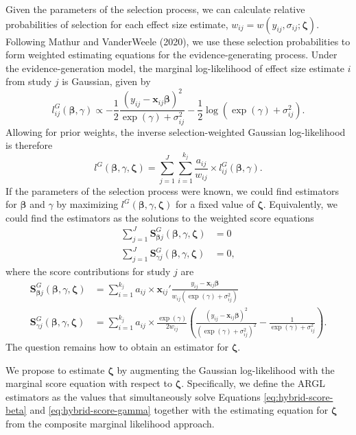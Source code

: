 \documentclass[
  american,
  man, donotrepeattitle,floatsintext]{apa7}
\begin{document}
Given the parameters of the selection process, we can calculate relative probabilities of selection for each effect size estimate, \(w_{ij} = w(y_{ij}, \sigma_{ij}; \boldsymbol\zeta)\). Following Mathur and VanderWeele (2020), we use these selection probabilities to form weighted estimating equations for the evidence-generating process. Under the evidence-generation model, the marginal log-likelihood of effect size estimate \(i\) from study \(j\) is Gaussian, given by
\[
l^G_{ij}(\boldsymbol\beta, \gamma) \propto - \frac{1}{2}\frac{(y_{ij} - \mathbf{x}_{ij} \boldsymbol\beta)^2}{\exp(\gamma) + \sigma_{ij}^2} - \frac{1}{2}\log(\exp(\gamma) + \sigma_{ij}^2).
\]
Allowing for prior weights, the inverse selection-weighted Gaussian log-likelihood is therefore
\[
l^G(\boldsymbol\beta, \gamma, \boldsymbol\zeta) = \sum_{j=1}^J \sum_{i=1}^{k_j} \frac{a_{ij}} {w_{ij}} \times l^G_{ij}(\boldsymbol\beta, \gamma).
\]
If the parameters of the selection process were known, we could find estimators for \(\boldsymbol\beta\) and \(\gamma\) by maximizing \(l^G(\boldsymbol\beta, \gamma, \boldsymbol\zeta)\) for a fixed value of \(\boldsymbol\zeta\).
Equivalently, we could find the estimators as the solutions to the weighted score equations
\begin{align}
\sum_{j=1}^J \mathbf{S}^G_{\boldsymbol\beta j} (\boldsymbol\beta, \gamma, \boldsymbol\zeta) &= 0 \label{eq:hybrid-score-beta} \\
\sum_{j=1}^J \mathbf{S}^G_{\gamma j} (\boldsymbol\beta, \gamma, \boldsymbol\zeta) &= 0, \label{eq:hybrid-score-gamma}
\end{align}
where the score contributions for study \(j\) are
\begin{align}
\mathbf{S}^G_{\boldsymbol\beta j} (\boldsymbol\beta, \gamma, \boldsymbol\zeta) &= \sum_{i=1}^{k_j} a_{ij} \times \mathbf{x}_{ij}' \frac{y_{ij} - \mathbf{x}_{ij} \boldsymbol\beta}{w_{ij} \left(\exp(\gamma) + \sigma_{ij}^2\right)} \\
\mathbf{S}^G_{\gamma j} (\boldsymbol\beta, \gamma, \boldsymbol\zeta) &= \sum_{i=1}^{k_j} a_{ij} \times \frac{\exp(\gamma)}{2 w_{ij}} \left(\frac{(y_{ij} -\mathbf{x}_{ij} \boldsymbol\beta)^2}{\left(\exp(\gamma) + \sigma_{ij}^2\right)^2} - \frac{1}{\exp(\gamma) + \sigma_{ij}^2}\right).
\end{align}
The question remains how to obtain an estimator for \(\boldsymbol\zeta\).

We propose to estimate \(\boldsymbol\zeta\) by augmenting the Gaussian log-likelihood with the marginal score equation with respect to \(\boldsymbol\zeta\).
Specifically, we define the ARGL estimators as the values that simultaneously solve Equations \eqref{eq:hybrid-score-beta} and \eqref{eq:hybrid-score-gamma} together with the estimating equation for \(\boldsymbol\zeta\) from the composite marginal likelihood approach.
\end{document}
